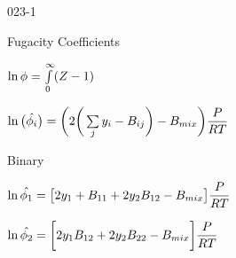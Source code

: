 \begin{mitframe}{023-1}
\begin{listone}
\begin{listtwo}
\begin{listthree}
   	\end{listthree}
		    
    \end{listtwo}    
    
    \item Fugacity Coefficients

    \begin{listtwo}
		
       \item $\ln\eleccoeff= \int\limits_{0}^{\infty}(\compress-1)$
        
        
        \item $\ln\big(\hat{\fhmolefrac{i}}\big)=\bigg(2\bigg(\sum\limits_{j} y_{i}-\virialcoeff{ij}\bigg)-\virialcoeff{\mixfunc}\bigg)\dfrac{\p}{\gasconst\Temp}$
        
       
              
               
        
        \item Binary
        
        \begin{listthree}
		
        	\item  $\ln\hat{\eleccoeff_{1}}=\big[2y_{1}+\virialcoeff{11}+2y_{2}\virialcoeff{12}-\virialcoeff{\mixfunc}\big]\dfrac{\p}{\gasconst\Temp}$
               
          \item $\ln\hat{\eleccoeff_{2}}= \bigg[2y_{1}\virialcoeff{12}+2y_{2}\virialcoeff{22}-\virialcoeff{\mixfunc}\bigg]\dfrac{\p}{\gasconst\Temp}$
          
	
    	\end{listthree}
	
    \end{listtwo}
                   
\end{listone}			

\end{mitframe}